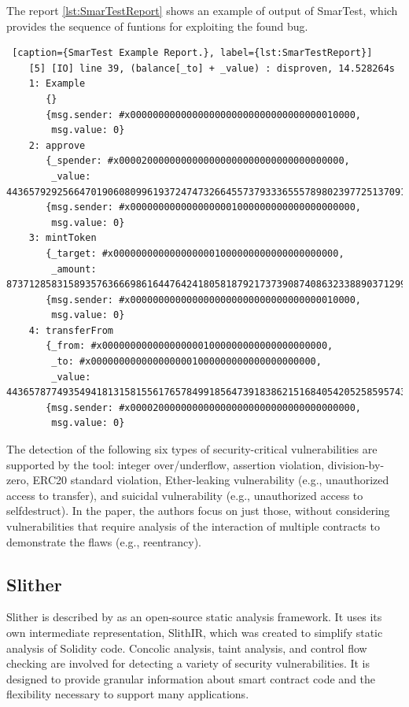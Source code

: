 The report \autoref{lst:SmarTestReport} shows an example of output of SmarTest, which provides the sequence of funtions for exploiting the found bug.
\begin{lstlisting} [caption={SmarTest Example Report.}, label={lst:SmarTestReport}]
    [5] [IO] line 39, (balance[_to] + _value) : disproven, 14.528264s
    1: Example
       {}
       {msg.sender: #x0000000000000000000000000000000000010000,
        msg.value: 0}
    2: approve
       {_spender: #x0000200000000000000000000000000000000000,
        _value: 44365792925664701906080996193724747326645573793336555789802397725137091694592}
       {msg.sender: #x0000000000000000001000000000000000000000,
        msg.value: 0}
    3: mintToken
       {_target: #x0000000000000000001000000000000000000000,
        _amount: 87371285831589357636669861644764241805818792173739087408632338890371299803136}
       {msg.sender: #x0000000000000000000000000000000000010000,
        msg.value: 0}
    4: transferFrom
       {_from: #x0000000000000000001000000000000000000000,
        _to: #x0000000000000000001000000000000000000000,
        _value: 44365787749354941813158155617657849918564739183862151684054205258595743830016}
       {msg.sender: #x0000200000000000000000000000000000000000,
        msg.value: 0}

\end{lstlisting}

The detection of  the following six types of security-critical vulnerabilities are supported by the tool: integer over/underflow, 
assertion violation, division-by-zero, 
ERC20 standard violation, Ether-leaking vulnerability (e.g., 
unauthorized access to transfer), and suicidal vulnerability 
(e.g., unauthorized access to selfdestruct).
In the paper, the authors  focus on just those, without considering vulnerabilities that require analysis of
the interaction of multiple contracts to demonstrate the flaws 
(e.g., reentrancy).





\subsection{Slither}
\label{sec:WithoutSpecification:Slither}
Slither is described by \citet{Slither} as an open-source static analysis framework.
It uses its own intermediate representation, SlithIR, which was created to simplify static analysis of Solidity code. 
Concolic analysis, taint analysis, and control flow checking are involved for detecting a variety
of security vulnerabilities. It is designed to provide
granular information about smart contract code and the flexibility necessary to support many applications.

